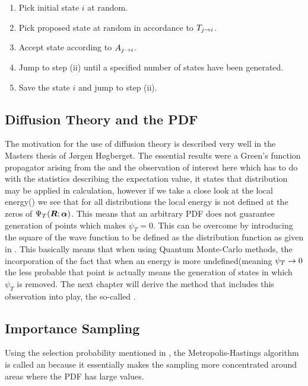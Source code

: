             \begin{enumerate}[label=(\roman*)]
                \item Pick initial state $i$ at random.
                \item Pick proposed state at random in accordance to
                    $T_{j\rightarrow i}$.
                \item Accept state according to $A_{j\rightarrow i}$.
                \item Jump to step (ii) until a specified number of states have
                    been generated.
                \item Save the state $i$ and jump to step (ii).
            \end{enumerate}

    \subsection{Diffusion Theory and the PDF\label{susec:diffTHpdf}}
        The motivation for the use of diffusion theory is described very well
        in the Masters thesis of Jørgen Høgberget\cite{jorgenThesis}. The
        essential results were a Green's function propagator arising from the
         and the observation of interest here
        which has to do with the statistics describing the expectation value,
        it states that  distribution may be applied in calculation,
        however if we take a close look at the local energy() we
        see that for all distributions the local energy is not defined at the
        zeros of ${\Psi}_T(\boldsymbol{{R}};\boldsymbol{{\alpha}})$.  This means that an arbitrary PDF does not guarantee
        generation of points which makes $\psi_T=0$. This can be overcome by
        introducing the square of the wave function to be defined as the
        distribution function as given in . This basically means
        that when using Quantum Monte-Carlo methods, the incorporation of the
        fact that when an energy is more undefined(meaning $\psi_T\rightarrow 0$ the
        less probable that point is actually means the generation of states in
        which $\psi_T$ is removed. The next chapter will derive the method that
        includes this observation into play, the so-called .

    \subsection{Importance Sampling\label{susec:impSamp}}
        Using the selection probability mentioned in , the
        Metropolis-Hastings algorithm is called an 
        because it essentially makes the sampling more concentrated around
        areas where the PDF has large values. \\


